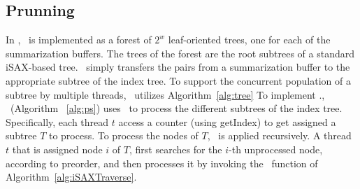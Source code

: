 \subsection{Prunning}

In \Fresh, \PS\ is implemented as a forest of $2^w$ leaf-oriented trees,
one for each of the summarization buffers. 
The trees of the forest are the root subtrees of a standard iSAX-based tree.
\TreePopulation\ simply transfers the pairs from a summarization buffer
to the appropriate subtree of the index tree. 
To support the concurrent population of a subtree by multiple threads, 
\Fresh\ utilizes Algorithm~\ref{alg:tree} 
%
To implement \PS.\Traverse, \Fresh\ (Algorithm ~\ref{alg:ps}) uses \Refresh\ to process 
the different subtrees of the index tree. Specifically, 
each thread $t$ access a counter (using getIndex) to get assigned a subtree $T$ to process.
To process the nodes of $T$, \Refresh\ is applied recursively.
A thread $t$ that is assigned node $i$ of $T$,
first searches for the $i$-th unprocessed node, according to preorder,
and then processes it by invoking the \Prunning\ function 
of Algorithm~\ref{alg:iSAXTraverse}. 

